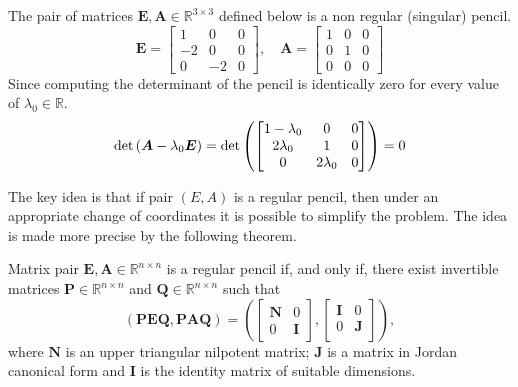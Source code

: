 		\begin{example}
			The pair of matrices $\bm{E},\bm{A}\in\mathbb{R}^{3\times 3}$ defined below is a non regular (singular) pencil.
			\begin{equation}
				\bm{E} = 
				\begin{bmatrix}
					1 	& 0 	& 0 \\
					-2 	& 0 	& 0 \\
					0 	& -2 	& 0 
				\end{bmatrix},
				\quad
				\bm{A} = 
				\begin{bmatrix}
					1 & 0 & 0 \\
					0 & 1 & 0 \\
					0 & 0 & 0
				\end{bmatrix}
			\end{equation}
			Since computing the determinant of the pencil is identically zero for every value of $\lambda_{0}\in\mathbb{R}$. 
			\begin{equation}
				\textnormal{det}\left(\bm{A}-\lambda_{0}\bm{E}\right) =\textnormal{det} 
				\left(
				\begin{bmatrix}
					1-\lambda_{0} 	& 0 			& 0 \\
					2\lambda_{0} 	& 1 			& 0 \\
					0 				& 2\lambda_{0} 	& 0 
				\end{bmatrix}
				\right) = 0 
			\end{equation} 
		\end{example}
		The key idea is that if pair $(E,A)$ is a regular pencil, then under an appropriate change of coordinates it is possible to simplify the problem. The idea is made more precise by the following theorem.
		\begin{theorem}
			Matrix pair $\bm{E},\bm{A}\in\mathbb{R}^{n\times n}$ is a regular pencil if, and only if, there exist invertible matrices $\bm{P}\in\mathbb{R}^{n\times n}$ and $\bm{Q}\in\mathbb{R}^{n\times n}$ such that
			\begin{equation}
			\label{eq:weierstrassform}
				(\bm{PEQ},\bm{PAQ}) = \left(
					\begin{bmatrix}
						\bm{N} & 0 \\
						0 & \bm{I}
					\end{bmatrix},
					\begin{bmatrix}
					 	\bm{I} & 0 \\
					 	0 & \bm{J} \\
					\end{bmatrix}
				\right),
			\end{equation}
			where $\bm{N}$ is an upper triangular nilpotent matrix; $\bm{J}$ is a matrix in Jordan canonical form and $\bm{I}$ is the identity matrix of suitable dimensions.
		\end{theorem}
